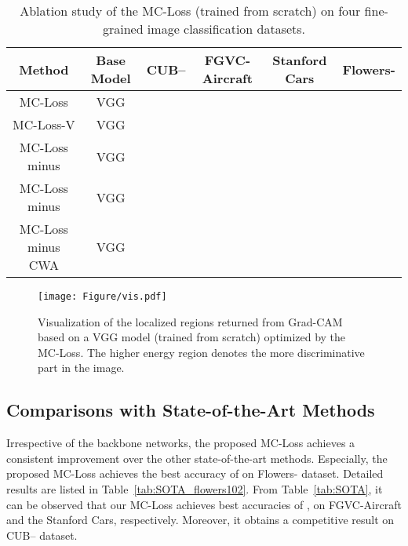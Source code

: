 \documentclass[journal]{IEEEtran}
\begin{document}
\begin{table*}[!t]
  \centering
  \caption{Ablation study of the MC-Loss (trained from scratch) on four fine-grained image classification datasets.}
  \small
\begin{tabular}{|c|c|c|c|c|c|}
    \hline
    Method                              & Base Model    & CUB--    & FGVC-Aircraft      & Stanford Cars       & Flowers- \\
    \hline
    \hline
    MC-Loss                             & VGG       &     &    &     &  \\
    MC-Loss-V                        & VGG       &              &             &              &  \\
    MC-Loss minus              & VGG       &              &             &              &  \\
    MC-Loss minus              & VGG       &              &             &              &  \\
MC-Loss minus CWA                   & VGG       &              &             &              &   \\
    \hline
    \end{tabular}\label{tab:table_Ablation}\end{table*}










\begin{figure*}[!t]
    \tiny
    \begin{center}

\texttt{[image: Figure/vis.pdf]}

\end{center}
    \tiny
\caption{Visualization of the localized regions returned from Grad-CAM~\cite{selvaraju2017grad} based on a VGG model (trained from scratch) optimized by the MC-Loss. The higher energy region denotes the more discriminative part in the image.}
\label{fig:visualization_MC2}
\end{figure*}



\subsection{Comparisons with State-of-the-Art Methods}\label{SOTA}

Irrespective of the backbone networks, the proposed MC-Loss achieves a consistent improvement over the other state-of-the-art methods. Especially, the proposed MC-Loss achieves the best accuracy of  on  Flowers- dataset. Detailed results are listed in Table~\ref{tab:SOTA_flowers102}. From Table~\ref{tab:SOTA}, it can be observed that our MC-Loss achieves best accuracies of ,  on  FGVC-Aircraft and the Stanford Cars, respectively. Moreover, it obtains a competitive result on  CUB-- dataset. 
\end{document}

